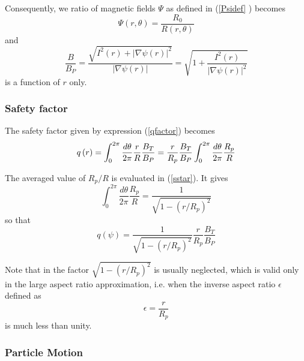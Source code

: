 Consequently, we ratio of magnetic fields $\Psi $ as defined in (\ref{Psidef}%
) becomes
\begin{equation}
\Psi \left( r,\theta \right) =\frac{R_{0}}{R\left( r,\theta \right) }
\label{Psidefcirc}
\end{equation}
and
\begin{equation}
\frac{B}{B_{P}}=\frac{\sqrt{I^{2}\left( r\right) +\left| \nabla \psi \left(
r\right) \right| ^{2}}}{\left| \nabla \psi \left( r\right) \right| }=\sqrt{1+%
\frac{I^{2}\left( r\right) }{\left| \nabla \psi \left( r\right) \right| ^{2}}%
}  \label{BsBpcirc}
\end{equation}
is a function of $r$ only.

\subsubsection{Safety factor}

The safety factor given by expression (\ref{qfactor}) becomes
\begin{equation}
q\left( r\right) =\int_{0}^{2\pi }\frac{d\theta }{2\pi }\frac{r}{R}\frac{%
B_{T}}{B_{P}}=\frac{r}{R_{p}}\frac{B_{T}}{B_{P}}\int_{0}^{2\pi }\frac{%
d\theta }{2\pi }\frac{R_{p}}{R}
\end{equation}

The averaged value of $R_{p}/R$ is evaluated in (\ref{sstar}). It gives
\begin{equation}
\int_{0}^{2\pi}\frac{d\theta}{2\pi}\frac{R_{p}}{R}=\frac{1}{\sqrt{1-\left(
r/R_{p}\right) ^{2}}}
\end{equation}
so that
\begin{equation}
q\left( \psi\right) =\frac{1}{\sqrt{1-\left( r/R_{p}\right) ^{2}}}\frac
{r}{R_{p}}\frac{B_{T}}{B_{P}}  \label{qcirc}
\end{equation}

Note that in the factor $\sqrt{1-\left( r/R_{p}\right) ^{2}}$ is usually
neglected, which is valid only in the large aspect ratio approximation, i.e.
when the inverse aspect ratio $\epsilon $ defined as
\begin{equation}
\epsilon =\frac{r}{R_{p}}
\end{equation}
is much less than unity.

\subsubsection{Particle Motion}

